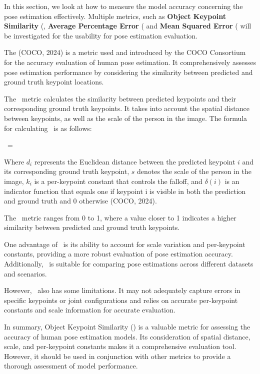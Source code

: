 In this section, we look at how to measure the model accuracy concerning the pose estimation effectively. Multiple metrics, such as {\bf Object Keypoint Similarity} (\OKS\), {\bf Average Percentage Error} (\APE\) and {\bf Mean Squared Error} (\MSE\) will be investigated for the usability for pose estimation evaluation.

The {\bf \OKS} (\scc COCO, 2024) is a metric used and introduced by the COCO Consortium for the accuracy evaluation of human pose estimation. It comprehensively assesses pose estimation performance by considering the similarity between predicted and ground truth keypoint locations.

The \OKS\ metric calculates the similarity between predicted keypoints and their corresponding ground truth keypoints. It takes into account the spatial distance between keypoints, as well as the scale of the person in the image. The formula for calculating \OKS\ is as follows:

\startplaceformula[reference=oks]
 \startformula \OKS\ = 
 \stopformula
\stopplaceformula

Where $ d_i $ represents the Euclidean distance between the predicted keypoint $ i $ and its corresponding ground truth keypoint, $ s $ denotes the scale of the person in the image, $ k_i $ is a per-keypoint constant that controls the falloff, and $ \delta(i) $ is an indicator function that equals one if keypoint i is visible in both the prediction and ground truth and 0 otherwise (\scc COCO, 2024).

The \OKS\ metric ranges from 0 to 1, where a value closer to 1 indicates a higher similarity between predicted and ground truth keypoints.

One advantage of \OKS\ is its ability to account for scale variation and per-keypoint constants, providing a more robust evaluation of pose estimation accuracy. Additionally, \OKS\ is suitable for comparing pose estimations across different datasets and scenarios.

However, \OKS\ also has some limitations. It may not adequately capture errors in specific keypoints or joint configurations and relies on accurate per-keypoint constants and scale information for accurate evaluation.

In summary, Object Keypoint Similarity (\OKS) is a valuable metric for assessing the accuracy of human pose estimation models. Its consideration of spatial distance, scale, and per-keypoint constants makes it a comprehensive evaluation tool. However, it should be used in conjunction with other metrics to provide a thorough assessment of model performance.

